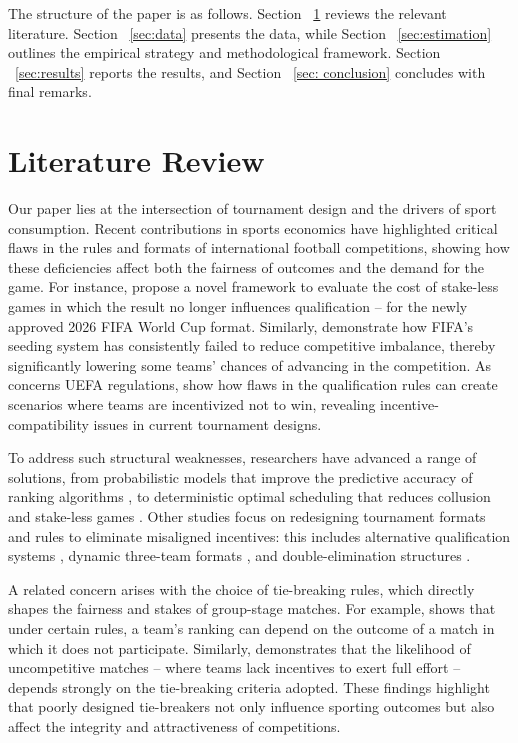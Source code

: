 \documentclass[11pt]{article}
\begin{document}
\vspace{0.5em}

The structure of the paper is as follows. Section ~\ref{sec:literature} reviews the relevant literature. Section ~\ref{sec:data} presents the data, while Section ~\ref{sec:estimation} outlines the empirical strategy and methodological framework. Section ~\ref{sec:results} reports the results, and Section ~\ref{sec: conclusion} concludes with final remarks.

\section{Literature Review}
\label{sec:literature}

Our paper lies at the intersection of tournament design and the drivers of sport consumption. Recent contributions in sports economics have highlighted critical flaws in the rules and formats of international football competitions, showing how these deficiencies affect both the fairness of outcomes and the demand for the game. For instance, \citet{csato2025increasing} propose a novel framework to evaluate the cost of stake-less  games in which the result no longer influences qualification -- for the newly approved 2026 FIFA World Cup format. Similarly,\citet{lapre2023evolution, lapre2022quantifying} demonstrate how FIFA’s seeding system has consistently failed to reduce competitive imbalance, thereby significantly lowering some teams’ chances of advancing in the competition. As concerns UEFA regulations, \citet{csato2020neither} show how flaws in the qualification rules can create scenarios where teams are incentivized not to win, revealing incentive-compatibility issues in current tournament designs.

To address such structural weaknesses, researchers have advanced a range of solutions, from probabilistic models that improve the predictive accuracy of ranking algorithms \citep{szczecinski2022fifa}, to deterministic optimal scheduling that reduces collusion and stake-less games \citep{chater2021fixing}. Other studies focus on redesigning tournament formats and rules to eliminate misaligned incentives: this includes alternative qualification systems \citep{guajardo2024tournament}, dynamic three-team formats \citep{troyano2023new}, and double-elimination structures \citep{renno2023double}.

\vspace{0.5em}

A related concern arises with the choice of tie-breaking rules, which directly shapes the fairness and stakes of group-stage matches. For example, \citet{berker2014tie} shows that under certain rules, a team’s ranking can depend on the outcome of a match in which it does not participate. Similarly, \citet{csato2023avoid} demonstrates that the likelihood of uncompetitive matches -- where teams lack incentives to exert full effort -- depends strongly on the tie-breaking criteria adopted. These findings highlight that poorly designed tie-breakers not only influence sporting outcomes but also affect the integrity and attractiveness of competitions.
\end{document}
